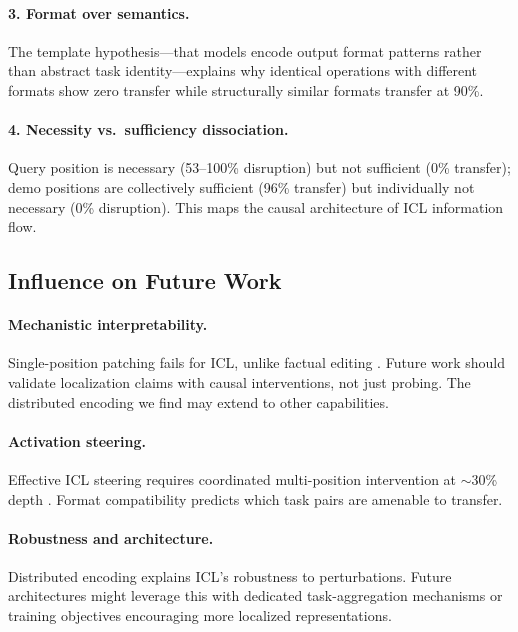 \documentclass{article}
\begin{document}
\paragraph{3. Format over semantics.} The template hypothesis---that models encode output format patterns rather than abstract task identity---explains why identical operations with different formats show zero transfer while structurally similar formats transfer at 90\%.

\paragraph{4. Necessity vs.\ sufficiency dissociation.} Query position is necessary (53--100\% disruption) but not sufficient (0\% transfer); demo positions are collectively sufficient (96\% transfer) but individually not necessary (0\% disruption). This maps the causal architecture of ICL information flow.

\subsection*{Influence on Future Work}

\paragraph{Mechanistic interpretability.} Single-position patching fails for ICL, unlike factual editing \citep{meng2022locating}. Future work should validate localization claims with causal interventions, not just probing. The distributed encoding we find may extend to other capabilities.

\paragraph{Activation steering.} Effective ICL steering requires coordinated multi-position intervention at $\sim$30\% depth \citep{turner2023activation}. Format compatibility predicts which task pairs are amenable to transfer.

\paragraph{Robustness and architecture.} Distributed encoding explains ICL's robustness to perturbations. Future architectures might leverage this with dedicated task-aggregation mechanisms or training objectives encouraging more localized representations.
\end{document}
